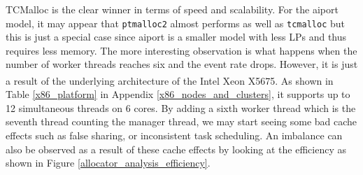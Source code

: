 \documentclass[11pt]{book}
\begin{document}
TCMalloc is the clear winner in terms of speed and scalability.  For the aiport model, it may appear
that \texttt{ptmalloc2} almost performs as well as \texttt{tcmalloc} but this is just a special case
since aiport is a smaller model with less LPs and thus requires less memory.  The more interesting
observation is what happens when the number of worker threads reaches six and the event rate drops.
However, it is just a result of the underlying architecture of the
Intel\textsuperscript{\textregistered} Xeon\textsuperscript{\textregistered} X5675.  As shown in
Table \ref{x86_platform} in Appendix \ref{x86_nodes_and_clusters}, it supports up to 12 simultaneous
threads on 6 cores.  By adding a sixth worker thread which is the seventh thread counting the
manager thread, we may start seeing some bad cache effects such as false sharing, or inconsistent
task scheduling.  An imbalance can also be observed as a result of these cache effects by looking at
the efficiency as shown in Figure \ref{allocator_analysis_efficiency}.
\end{document}
